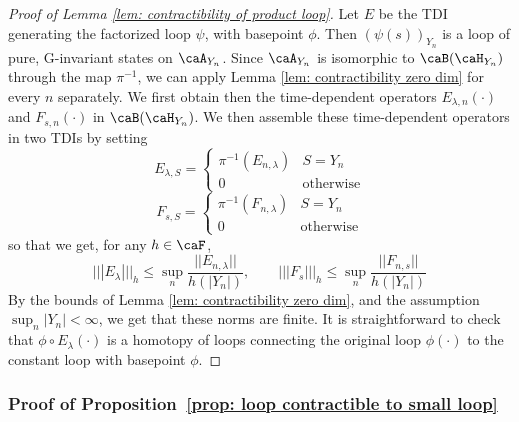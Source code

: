 \begin{proof}[Proof of Lemma \ref{lem: contractibility of product loop}]
	Let $E$ be the TDI generating the factorized loop $\psi$, with basepoint $\phi$. 
	Then $(\psi(s))_{Y_n}$ is a loop of pure, G-invariant states on $\caA_{Y_n}$.
	Since $\caA_{Y_n}$ is isomorphic to $\caB(\caH_{Y_n})$ through the map $\pi^{-1}$, we can apply Lemma \ref{lem: contractibility zero dim} for every $n$ separately. We first obtain then the time-dependent operators $E_{\lambda,n}(\cdot)$ and $F_{s,n}(\cdot)$ in $\caB(\caH_{Y_n})$.
	We then assemble these time-dependent operators in two TDIs by setting
	$$
	E_{\lambda,S}=\begin{cases} \pi^{-1}(E_{n,\lambda})  &  S=Y_n  \\  0 & \text{otherwise}   \end{cases}
	$$
	$$
	F_{s,S}=\begin{cases} \pi^{-1}(F_{n,\lambda})  &  S=Y_n  \\  0 & \text{otherwise}   \end{cases}
	$$
	so that we get, for any $h\in\caF$, 
	$$
	|||E_\lambda|||_h \leq \sup_{n} \frac{ ||E_{n,\lambda}||}{h(|Y_n|)}, \qquad  |||F_s|||_h \leq \sup_{n} \frac{ ||F_{n,s}||}{h(|Y_n|)}
	$$
	By the bounds of Lemma \ref{lem: contractibility zero dim}, and the assumption $\sup_n|Y_n|<\infty$, we get that these norms are finite. 
	It is straightforward to check that $\phi\circ E_{\lambda}(\cdot)$ is a homotopy of loops connecting the original loop $\phi(\cdot)$ to the constant loop with basepoint $\phi$. 
\end{proof}






\subsubsection{Proof of Proposition~\ref{prop: loop contractible to small loop}}

